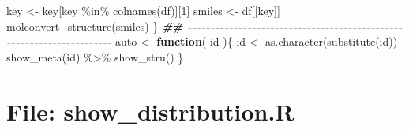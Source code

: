\documentclass[
]{article}
\newenvironment{Shaded}{\begin{snugshade}}{\end{snugshade}}
\newcommand{\ControlFlowTok}[1]{\textcolor[rgb]{0.13,0.29,0.53}{\textbf{#1}}}
\newcommand{\DecValTok}[1]{\textcolor[rgb]{0.00,0.00,0.81}{#1}}
\newcommand{\DocumentationTok}[1]{\textcolor[rgb]{0.56,0.35,0.01}{\textbf{\textit{#1}}}}
\newcommand{\FunctionTok}[1]{\textcolor[rgb]{0.00,0.00,0.00}{#1}}
\newcommand{\NormalTok}[1]{#1}
\newcommand{\OtherTok}[1]{\textcolor[rgb]{0.56,0.35,0.01}{#1}}
\newcommand{\SpecialCharTok}[1]{\textcolor[rgb]{0.00,0.00,0.00}{#1}}
\begin{document}
\begin{Shaded}
\begin{Highlighting}[]
\NormalTok{    key }\OtherTok{\textless{}{-}}\NormalTok{ key[key }\SpecialCharTok{\%in\%} \FunctionTok{colnames}\NormalTok{(df)][}\DecValTok{1}\NormalTok{]}
\NormalTok{    smiles }\OtherTok{\textless{}{-}}\NormalTok{ df[[key]]}
    \FunctionTok{molconvert\_structure}\NormalTok{(smiles)}
\NormalTok{  \}}
\DocumentationTok{\#\# {-}{-}{-}{-}{-}{-}{-}{-}{-}{-}{-}{-}{-}{-}{-}{-}{-}{-}{-}{-}{-}{-}{-}{-}{-}{-}{-}{-}{-}{-}{-}{-}{-}{-}{-}{-}{-}{-}{-}{-}{-}{-}{-}{-}{-}{-}{-}{-}{-}{-}{-}{-}{-}{-}{-}{-}{-}{-}{-}{-}{-}{-}{-}{-}{-}{-}{-}{-}{-}{-} }
\NormalTok{auto }\OtherTok{\textless{}{-}} 
  \ControlFlowTok{function}\NormalTok{(}
\NormalTok{           id}
\NormalTok{           )\{}
\NormalTok{    id }\OtherTok{\textless{}{-}} \FunctionTok{as.character}\NormalTok{(}\FunctionTok{substitute}\NormalTok{(id))}
    \FunctionTok{show\_meta}\NormalTok{(id) }\SpecialCharTok{\%\textgreater{}\%}
      \FunctionTok{show\_stru}\NormalTok{()}
\NormalTok{  \}}
\end{Highlighting}
\end{Shaded}

\hypertarget{file-show_distribution.r}{%
\section{File: show\_distribution.R}\label{file-show_distribution.r}}
\end{document}
